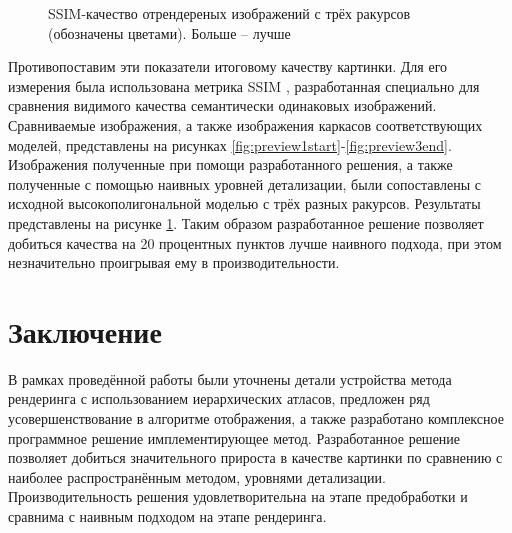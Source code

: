 \documentclass[12pt]{extarticle}
\begin{document}
\begin{figure}
  \centering
  \caption{SSIM-качество отрендереных изображений с трёх ракурсов (обозначены цветами). Больше -- лучше}
  \label{fig:quality}
\end{figure}

Противопоставим эти показатели итоговому качеству картинки. Для его измерения была использована метрика SSIM \cite{wang2004image}, разработанная специально для сравнения видимого качества семантически одинаковых изображений. Сравниваемые изображения, а также изображения каркасов соответствующих моделей, представлены на рисунках \ref{fig:preview1start}-\ref{fig:preview3end}. Изображения полученные при помощи разработанного решения, а также полученные с помощью наивных уровней детализации, были сопоставлены с исходной высокополигональной моделью с трёх разных ракурсов. Результаты представлены на рисунке \ref{fig:quality}. Таким образом разработанное решение позволяет добиться качества на 20 процентных пунктов лучше наивного подхода, при этом незначительно проигрывая ему в производительности.

\section{Заключение}
В рамках проведённой работы были уточнены детали устройства метода рендеринга с использованием иерархических атласов, предложен ряд усовершенствование в алгоритме отображения, а также разработано комплексное программное решение имплементирующее метод. Разработанное решение позволяет добиться значительного прироста в качестве картинки по сравнению с наиболее распространённым методом, уровнями детализации. Производительность решения удовлетворительна на этапе предобработки и сравнима с наивным подходом на этапе рендеринга.
\end{document}
